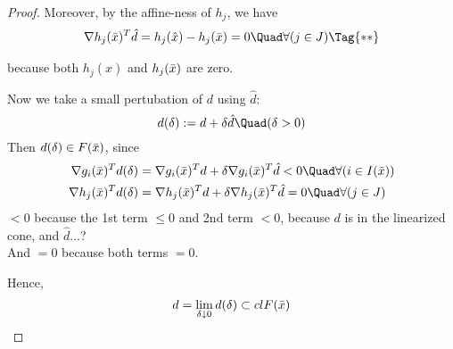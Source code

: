 \begin{proof}
	Moreover, by the affine-ness of $h_j$, we have
	\begin{align*}
		\nabla h_j(\bx)^T\hat d = h_j(\hat x)-h_j(\bx)=0\Quad\forall(j\in J)\Tag{**}
	\end{align*}

	because both $h_j(\hat x)$ and $h_j(\bar x)$ are zero.

	Now we take a small pertubation of $d$ using $\hat d$:
	$$
		d(\delta):= d + \delta\hat d\Quad(\delta>0)
	$$
	Then $d(\delta)\in F(\bar x)$, since
	\begin{align*}
		\nabla g_i(\bx)^Td(\delta) & =\nabla g_i(\bx)^Td + \delta\nabla g_i(\bx)^T\hat d<0 \Quad\forall(i\in\Act) \\
		\nabla h_j(\bx)^Td(\delta) & =\nabla h_j(\bx)^Td + \delta\nabla h_j(\bx)^T\hat d=0 \Quad\forall(j\in J)
	\end{align*}
	$<0$ because the 1st term $\leq0$ and 2nd term $<0$, because $d$ is
	in the linearized cone, and $\hat d$...? \\
	And $=0$ because both terms $=0$.

	Hence,
	$$
		d=\lim_{\delta\downarrow0}d(\delta) \subset clF(\bar x)
	$$
\end{proof}
